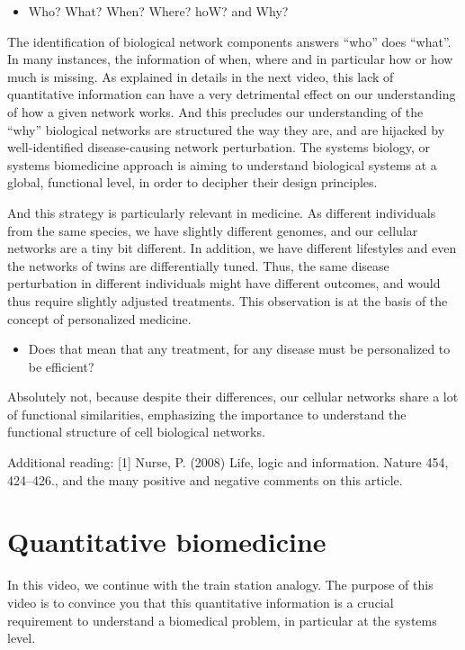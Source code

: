 \documentclass[
]{book}
\providecommand{\tightlist}{%
  \setlength{\itemsep}{0pt}\setlength{\parskip}{0pt}}
\begin{document}
\begin{itemize}
\tightlist
\item
  Who? What? When? Where? hoW? and Why?
\end{itemize}

The identification of biological network components answers ``who'' does ``what''. In many instances, the information of when, where and in particular how or how much is missing. As explained in details in the next video, this lack of quantitative information can have a very detrimental effect on our understanding of how a given network works. And this precludes our understanding of the ``why'' biological networks are structured the way they are, and are hijacked by well-identified disease-causing network perturbation. The systems biology, or systems biomedicine approach is aiming to understand biological systems at a global, functional level, in order to decipher their design principles.

And this strategy is particularly relevant in medicine. As different individuals from the same species, we have slightly different genomes, and our cellular networks are a tiny bit different. In addition, we have different lifestyles and even the networks of twins are differentially tuned. Thus, the same disease perturbation in different individuals might have different outcomes, and would thus require slightly adjusted treatments. This observation is at the basis of the concept of personalized medicine.

\begin{itemize}
\tightlist
\item
  Does that mean that any treatment, for any disease must be personalized to be efficient?
\end{itemize}

Absolutely not, because despite their differences, our cellular networks share a lot of functional similarities, emphasizing the importance to understand the functional structure of cell biological networks.

Additional reading:
{[}1{]} Nurse, P. (2008) Life, logic and information. Nature 454, 424--426., and the many positive and negative comments on this article.

\hypertarget{quantitative-biomedicine}{%
\chapter{Quantitative biomedicine}\label{quantitative-biomedicine}}

In this video, we continue with the train station analogy. The purpose of this video is to convince you that this quantitative information is a crucial requirement to understand a biomedical problem, in particular at the systems level.
\end{document}
